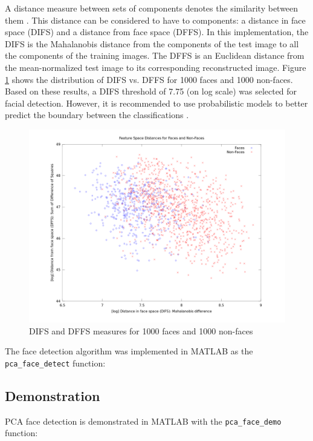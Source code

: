 \documentclass[10pt,letterpaper]{article}
\begin{document}
A distance measure between sets of components denotes the similarity between them
\cite{turk_pentland_1991}. This distance can be considered to have to components:
a distance in face space (DIFS) and a distance from face space (DFFS). In this 
implementation, the DIFS is the Mahalanobis distance from the components of the
test image to all the components of the training images. The DFFS is an Euclidean
distance from the mean-normalized test image to its corresponding reconstructed
image. Figure \ref{fig:distances} shows the distribution of DIFS vs. DFFS for
1000 faces and 1000 non-faces. Based on these results, a DIFS threshold of 7.75
(on log scale) was selected for facial detection. 
However, it is recommended to use probabilistic models to better predict the 
boundary between the classifications \cite{moghaddam_pentland_1997}.

\begin{landscape}

\begin{figure}[H]
    \centering
    \includegraphics[width=8in]{facespace_distances.png}
    \caption{DIFS and DFFS measures for 1000 faces and 1000 non-faces}
    \label{fig:distances}
\end{figure}

\end{landscape}

The face detection algorithm was implemented in MATLAB as the \verb|pca_face_detect|
function:
 
{\footnotesize
    
}

\subsection{Demonstration}
PCA face detection is demonstrated in MATLAB with the \verb|pca_face_demo| function:

{\footnotesize
    
}




\end{document}
